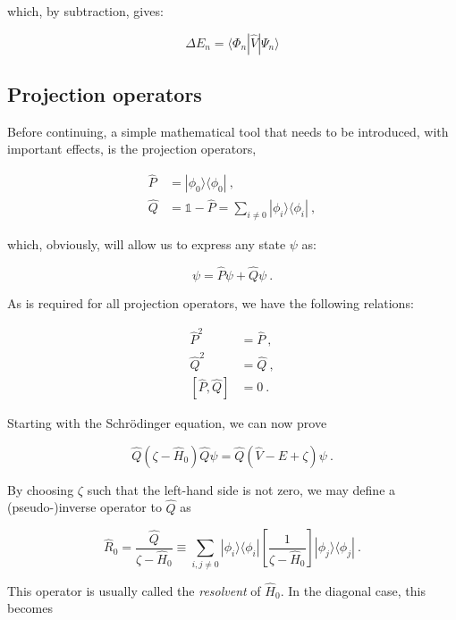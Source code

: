 \documentclass[10pt,twoside]{report}
\begin{document}
	\noindent which, by subtraction, gives:
	
	\begin{equation}
	\Delta E_n = \langle\Phi_n|\hat{V}|\Psi_n\rangle
	\end{equation}
	
	\subsection{Projection operators}
	Before continuing, a simple mathematical tool that needs to be introduced, with important effects, is the projection operators,
	
	\begin{align}
		\hat{P} &= |\phi_0\rangle\langle\phi_0| \:,\\
		\hat{Q} &= \mathds{1} - \hat{P} = \sum_{i\neq 0} |\phi_i\rangle\langle\phi_i|\:,
	\end{align}
	
	\noindent which, obviously, will allow us to express any state $\psi$ as:
	
	\begin{equation}
		\psi = \hat{P}\psi + \hat{Q}\psi \:.
	\end{equation}
	
	As is required for all projection operators, we have the following relations:
	
	\begin{align}
		\hat{P}^2 &= \hat{P} \:,\\
		\hat{Q}^2 &= \hat{Q} \:,\\
		[\hat{P},\hat{Q}] &= 0 \:.
	\end{align}
	
	Starting with the Schr\"odinger equation, we can now prove
	
	\begin{equation}
		\hat{Q}(\zeta - \hat{H}_0)\hat{Q}\psi = \hat{Q}(\hat{V}-E+\zeta)\psi \:.
	\end{equation}
	
	By choosing $\zeta$ such that the left-hand side is not zero, we may define a (pseudo-)inverse operator to $\hat{Q}$ as
	
	\begin{equation}
		\hat{R}_0 = \frac{\hat{Q}}{\zeta - \hat{H}_0} \equiv \sum_{i,j\neq 0} |\phi_i\rangle\langle\phi_i|\left[\frac{1}{\zeta-\hat{H}_0}\right]|\phi_j\rangle\langle\phi_j| \:.
	\end{equation}
	
	This operator is usually called the \emph{resolvent} of $\hat{H}_0$. In the diagonal case, this becomes
	
\end{document}
